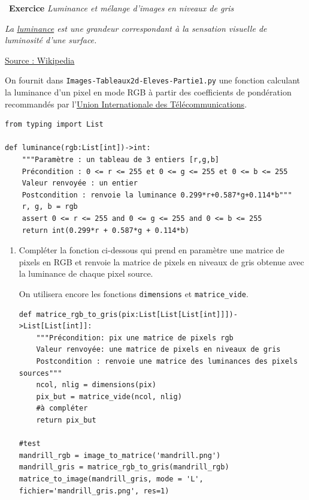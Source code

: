 \documentclass[a4paper, french, 12pt]{article}
\newcounter{exo}
\newenvironment{exercice}[1]
{\par \medskip   \addtocounter{exo}{1} \noindent  
\begin{bclogo}[arrondi =0.1,   noborder = true, logo=\bccrayon, marge=4]{~\textbf{Exercice} \textbf{\theexo} {\itshape #1} }  \par}
{
\end{bclogo}
 \par \bigskip }
\newcounter{def}
\begin{document}
\begin{exercice}{Luminance et mélange d'images en niveaux de gris}

\medskip


{\itshape
La \href{https://fr.wikipedia.org/wiki/Luminance}{luminance} est une grandeur correspondant à la sensation visuelle de luminosité d'une surface. 

\underline{Source : Wikipedia}

}

\medskip

On fournit dans \texttt{Images-Tableaux2d-Eleves-Partie1.py} une fonction calculant la luminance d'un pixel en mode RGB à partir des coefficients de pondération recommandés par l'\href{https://www.itu.int/}{Union Internationale des Télécommunications}.

\begin{lstlisting}[style=rond]
from typing import List 

def luminance(rgb:List[int])->int:
    """Paramètre : un tableau de 3 entiers [r,g,b]
    Précondition : 0 <= r <= 255 et 0 <= g <= 255 et 0 <= b <= 255 
    Valeur renvoyée : un entier
    Postcondition : renvoie la luminance 0.299*r+0.587*g+0.114*b"""     
    r, g, b = rgb
    assert 0 <= r <= 255 and 0 <= g <= 255 and 0 <= b <= 255
    return int(0.299*r + 0.587*g + 0.114*b)
\end{lstlisting}


\begin{enumerate}
	\item Compléter la fonction ci-dessous qui prend en paramètre  une matrice de pixels en RGB  et renvoie la matrice de pixels en niveaux de gris obtenue avec la luminance de  chaque pixel source. 
	
\bcattention{} On utilisera encore les fonctions  \texttt{dimensions} et  \texttt{matrice\_vide}.
	
\begin{lstlisting}[style=rond]
def matrice_rgb_to_gris(pix:List[List[List[int]]])->List[List[int]]:
    """Précondition: pix une matrice de pixels rgb
    Valeur renvoyée: une matrice de pixels en niveaux de gris
    Postcondition : renvoie une matrice des luminances des pixels sources"""
    ncol, nlig = dimensions(pix)
    pix_but = matrice_vide(ncol, nlig)
    #à compléter
    return pix_but
    
#test
mandrill_rgb = image_to_matrice('mandrill.png')
mandrill_gris = matrice_rgb_to_gris(mandrill_rgb)
matrice_to_image(mandrill_gris, mode = 'L', fichier='mandrill_gris.png', res=1)
\end{lstlisting}


\end{enumerate}
\end{exercice}
\end{document}
